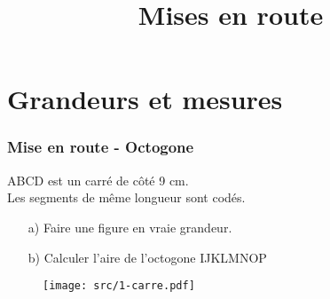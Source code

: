 \documentclass{beamer}
\title{Mises en route}
\begin{document}
\frame{\titlepage}

\section{Grandeurs et mesures}

\begin{frame}
  \frametitle{Mise en route - Octogone}

    
    \begin{multicols}{2}
      
      ABCD est un carré de côté 9 cm. \\
	Les segments de même longueur sont codés.
      
      \begin{enumerate}
      \item[a)] Faire une figure en vraie grandeur.
      \item[b)] Calculer l'aire de l'octogone IJKLMNOP
      \end{enumerate}
      
  \begin{figure}[H]
    \centering
    \texttt{[image: src/1-carre.pdf]}
  \end{figure}
  
    \end{multicols}

\end{frame}
\end{document}
